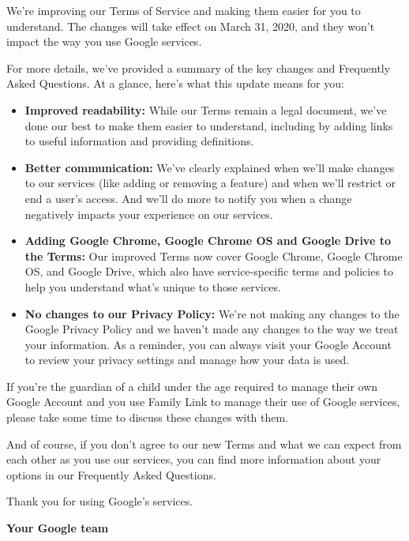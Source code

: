 \documentclass[12pt]{sigbovik-review}
\author{\textless sigbovik@gmail.com\textgreater}
\begin{document}
\maketitle

We’re improving our Terms of Service and making them easier for you to
understand. The changes will take effect on March 31, 2020, and they won’t
impact the way you use Google services.

For more details, we’ve provided a summary of the key changes and Frequently
Asked Questions. At a glance, here’s what this update means for you:

\begin{itemize}
\item \textbf{Improved readability:} While our Terms remain a legal document, we’ve
done our best to make them easier to understand, including by adding
links to useful information and providing definitions.

\item \textbf{Better communication:} We’ve clearly explained when we’ll make
changes to our services (like adding or removing a feature) and when
we’ll restrict or end a user’s access. And we’ll do more to notify you
when a change negatively impacts your experience on our services.

\item \textbf{Adding Google Chrome, Google Chrome OS and Google Drive to
the Terms:} Our improved Terms now cover Google Chrome, Google
Chrome OS, and Google Drive, which also have service-specific terms
and policies to help you understand what’s unique to those services.

\item \textbf{No changes to our Privacy Policy:} We’re not making any changes to
the Google Privacy Policy and we haven't made any changes to the way
we treat your information. As a reminder, you can always visit your
Google Account to review your privacy settings and manage how your
data is used.
\end{itemize}

If you’re the guardian of a child under the age required to manage their own
Google Account and you use Family Link to manage their use of Google
services, please take some time to discuss these changes with them.

And of course, if you don’t agree to our new Terms and what we can expect from
each other as you use our services, you can find more information about your
options in our Frequently Asked Questions.

Thank you for using Google’s services.

\textbf{Your Google team}
\end{document}
